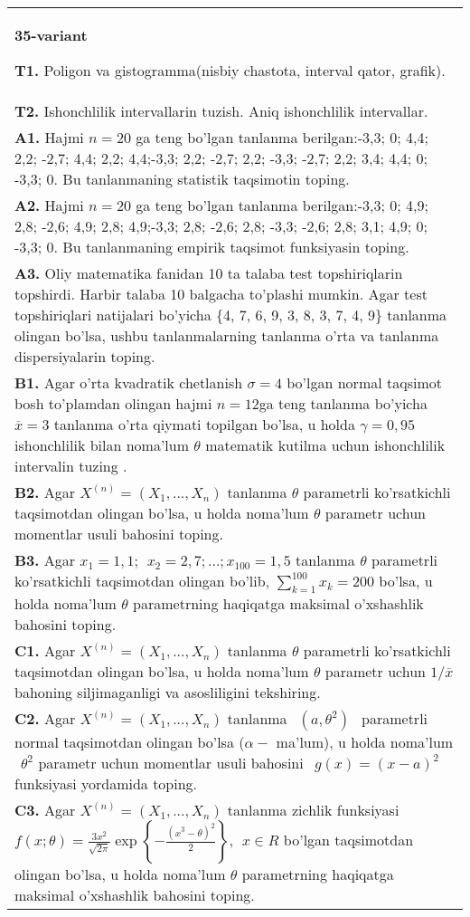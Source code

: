 \documentclass{article}
\begin{document}
\begin{tabular}{m{17cm}}
\textbf{35-variant}
\newline

\textbf{T1.} 
Poligon va gistogramma(nisbiy chastota, interval qator, grafik).
\\
\textbf{T2.} 
Ishonchlilik intervallarin tuzish. Aniq ishonchlilik intervallar.
\\
\textbf{A1.} 
Hajmi \(n = 20\) ga teng bo'lgan tanlanma berilgan:-3,3; 0; 4,4; 2,2; -2,7; 4,4; 2,2; 4,4;-3,3; 2,2; -2,7; 2,2; -3,3; -2,7; 2,2; 3,4; 4,4; 0; -3,3; 0. Bu tanlanmaning statistik taqsimotin toping.
\\
\textbf{A2.} 
Hajmi \(n = 20\) ga teng bo'lgan tanlanma berilgan:-3,3; 0; 4,9; 2,8; -2,6; 4,9; 2,8; 4,9;-3,3; 2,8; -2,6; 2,8; -3,3; -2,6; 2,8; 3,1; 4,9; 0; -3,3; 0. Bu tanlanmaning empirik taqsimot funksiyasin toping.
\\
\textbf{A3.} 
Oliy matematika fanidan 10 ta talaba test topshiriqlarin topshirdi. Harbir talaba 10 balgacha to'plashi mumkin. Agar test topshiriqlari natijalari bo'yicha \{4, 7, 6, 9, 3, 8, 3, 7, 4, 9\} tanlanma olingan bo'lsa, ushbu tanlanmalarning tanlanma o'rta va tanlanma dispersiyalarin toping.
\\
\textbf{B1.} 
Agar o'rta kvadratik chetlanish \(\sigma = 4\) bo'lgan normal taqsimot bosh to'plamdan olingan hajmi \(n = 12\)ga teng tanlanma bo'yicha \(\overline{x} = 3\) tanlanma o'rta qiymati topilgan bo'lsa, u holda \(\gamma = 0,95\) ishonchlilik bilan noma'lum \(\theta\) matematik kutilma uchun ishonchlilik intervalin tuzing .
\\
\textbf{B2.} 
Agar \(X^{(n)} = \left( X_{1},...,X_{n} \right)\) tanlanma \(\theta\) parametrli ko'rsatkichli taqsimotdan olingan bo'lsa, u holda noma'lum \(\theta\) parametr uchun momentlar usuli bahosini toping.
\\
\textbf{B3.} 
Agar \(x_{1} = 1,1;\ \ x_{2} = 2,7;\ldots;x_{100} = 1,5\) tanlanma \(\theta\) parametrli ko'rsatkichli taqsimotdan olingan bo'lib, \(\sum_{k = 1}^{100}x_{k} = 200\) bo'lsa, u holda noma'lum \(\theta\) parametrning haqiqatga maksimal o'xshashlik bahosini toping.
\\
\textbf{C1.} 
Agar \(X^{(n)} = \left( X_{1},...,X_{n} \right)\) tanlanma \(\theta\) parametrli ko'rsatkichli taqsimotdan olingan bo'lsa, u holda noma'lum \(\theta\) parametr uchun \(1/\overline{x}\) bahoning siljimaganligi va asosliligini tekshiring.
\\
\textbf{C2.} 
Agar \(X^{(n)} = \left( X_{1},...,X_{n} \right)\) tanlanma \(\ \ (a,\theta^{2})\ \ \) parametrli normal taqsimotdan olingan bo'lsa (\(\alpha -\) ma'lum), u holda noma'lum \(\ \ \theta^{2}\) parametr uchun momentlar usuli bahosini \(\ \ g(x) = (x - a)^{2}\) funksiyasi yordamida toping.
\\
\textbf{C3.} 
Agar \(X^{(n)} = \left( X_{1},...,X_{n} \right)\) tanlanma zichlik funksiyasi \(f(x;\theta) = \frac{3x^{2}}{\sqrt{2\pi}}\exp\left\{ - \frac{\left( x^{3} - \theta \right)^{2}}{2} \right\},\ \ x \in R\) bo'lgan taqsimotdan olingan bo'lsa, u holda noma'lum \(\theta\) parametrning haqiqatga maksimal o'xshashlik bahosini toping.
\\

\end{tabular}
\end{document}
